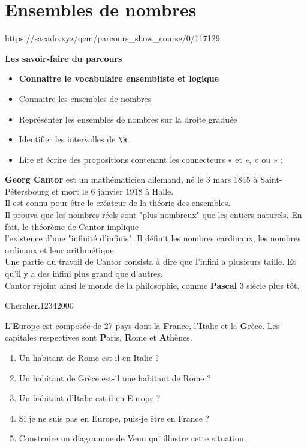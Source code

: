 \chapter{Ensembles de nombres}
{https://sacado.xyz/qcm/parcours_show_course/0/117129}
{


 \begin{CpsCol}
\textbf{Les savoir-faire du parcours}
 \begin{itemize}
 \item \textbf{Connaitre le vocabulaire ensembliste et logique}
 \item Connaitre les ensembles de nombres
 \item Représenter les ensembles de nombres sur la droite graduée
 \item Identifier les intervalles de $\R$
 \item Lire et écrire des propositions contenant les connecteurs « et », « ou » ;

 \end{itemize}
 \end{CpsCol}


\begin{His}

\textbf{Georg Cantor} est un mathématicien allemand, né le 3 mars 1845 à Saint-Pétersbourg et mort le $6$ janvier $1918$ à Halle.\\ 
Il est connu pour être le créateur de la théorie des ensembles.\\ 
Il prouva que les nombres réels sont "plus nombreux" que les entiers naturels. En fait, le théorème de Cantor implique\\ 
l'existence d'une "infinité d'infinis". Il définit les nombres cardinaux, les nombres ordinaux et leur arithmétique. \\ 
Une partie du travail de Cantor consista à dire que l'infini a plusieurs taille. Et qu'il y a des infini plus grand que d'autres. \\ 
Cantor rejoint ainsi le monde de la philosophie, comme \textbf{Pascal} 3 siècle plus tôt. 

\end{His}

 

\begin{ExoDec}{Chercher.}{1234}{2}{0}{0}{0}

L'\textbf{E}urope est composée de 27 pays dont la \textbf{F}rance, l'\textbf{I}talie et la \textbf{G}rèce. Les capitales respectives sont \textbf{P}aris, \textbf{R}ome et \textbf{A}thènes. 
\begin{enumerate}
\item Un habitant de Rome est-il en Italie ? 
\item Un habitant de Grèce est-il une habitant de Rome ? 
\item Un habitant d'Italie est-il en Europe ?
\item Si je ne suis pas en Europe, puis-je être en France ?
\item Construire un diagramme de Venn qui illustre cette situation.
\end{enumerate}


\end{ExoDec}}
